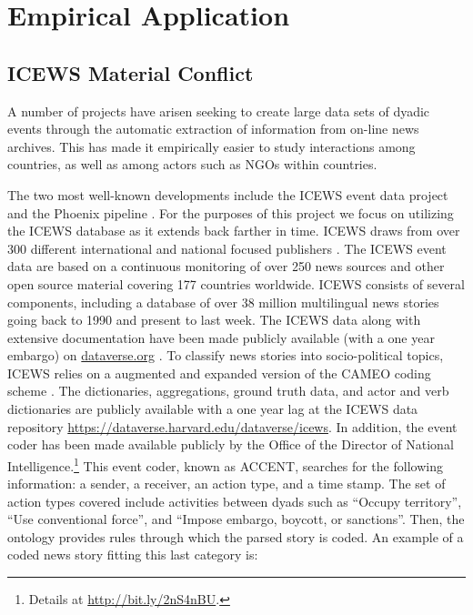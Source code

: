\section*{\textbf{Empirical Application}}

\subsection*{ICEWS Material Conflict}

A number of projects have arisen seeking to create large data sets of dyadic events through the automatic extraction of information from on-line news archives. This has made it empirically easier to study interactions among countries, as well as among actors such as NGOs within countries.

The two most well-known developments include the ICEWS event data project \citep{icews:2015:data} and the Phoenix pipeline \citep{oeda:2016}. For the purposes of this project we focus on utilizing the ICEWS database as it extends back farther in time. ICEWS draws from over 300 different international and national focused publishers \citep{boschee:etal:2015}. The ICEWS event data are based on a continuous monitoring of over 250 news sources and other open source material covering 177 countries worldwide. ICEWS consists of several components, including a database of over 38 million multilingual news stories going back to 1990 and present to last week. The ICEWS data along with extensive documentation have been made publicly available (with a one year embargo) on \url{dataverse.org} \citep{icews:2015:aggregations,icews:2015:data}. To classify news stories into socio-political topics, ICEWS relies on a augmented and expanded version of the CAMEO coding scheme \citep{schrodt:etal:2009}. The dictionaries, aggregations, ground truth data, and actor and verb dictionaries are publicly  available with a one year lag at the ICEWS data repository \url{https://dataverse.harvard.edu/dataverse/icews}. In addition,  the event coder has been made available publicly by the Office of the Director of National Intelligence.\footnote{Details at \url{http://bit.ly/2nS4nBU}.} This event coder, known as ACCENT, searches for the following information: a sender, a receiver, an action type, and a time stamp. The set of action types covered include activities between dyads such as ``Occupy territory'', ``Use conventional force'', and ``Impose embargo, boycott, or sanctions''. Then, the ontology provides rules through which the parsed story is coded. An example of a coded news story fitting this last category is:

